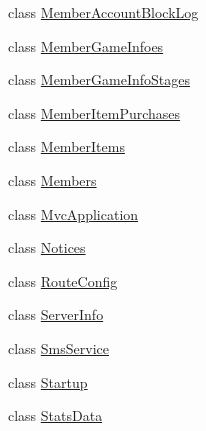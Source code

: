 \begin{DoxyCompactItemize}
\item 
class \hyperlink{class_cloud_bread_admin_web_1_1_member_account_block_log}{Member\+Account\+Block\+Log}
\item 
class \hyperlink{class_cloud_bread_admin_web_1_1_member_game_infoes}{Member\+Game\+Infoes}
\item 
class \hyperlink{class_cloud_bread_admin_web_1_1_member_game_info_stages}{Member\+Game\+Info\+Stages}
\item 
class \hyperlink{class_cloud_bread_admin_web_1_1_member_item_purchases}{Member\+Item\+Purchases}
\item 
class \hyperlink{class_cloud_bread_admin_web_1_1_member_items}{Member\+Items}
\item 
class \hyperlink{class_cloud_bread_admin_web_1_1_members}{Members}
\item 
class \hyperlink{class_cloud_bread_admin_web_1_1_mvc_application}{Mvc\+Application}
\item 
class \hyperlink{class_cloud_bread_admin_web_1_1_notices}{Notices}
\item 
class \hyperlink{class_cloud_bread_admin_web_1_1_route_config}{Route\+Config}
\item 
class \hyperlink{class_cloud_bread_admin_web_1_1_server_info}{Server\+Info}
\item 
class \hyperlink{class_cloud_bread_admin_web_1_1_sms_service}{Sms\+Service}
\item 
class \hyperlink{class_cloud_bread_admin_web_1_1_startup}{Startup}
\item 
class \hyperlink{class_cloud_bread_admin_web_1_1_stats_data}{Stats\+Data}
\end{DoxyCompactItemize}
